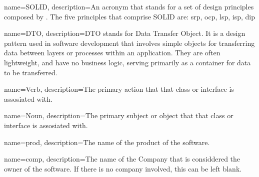 
{ name=SOLID, description={An acronym that stands for a set of design principles
    composed by . The five
    principles that comprise SOLID are: \acrlong*{srp}, \acrlong*{ocp}, \acrlong*{lsp},
    \acrlong*{isp}, \acrlong*{dip}} }

{ name=DTO, description={DTO stands for Data Transfer Object. It is a design pattern used
    in software development that involves simple objects for transferring data between
    layers or processes within an application. They are often lightweight, and have no
    business logic, serving primarily as a container for data to be transferred.} }

{
    name=Verb,
    description={The primary action that that class or interface is assosiated with.}
}

{
    name=Noun,
    description={The primary subject or object that that class or interface is assosiated with.}
}

{
    name=prod,
    description={The name of the product of the software.}
}

{
    name=comp,
    description={The name of the Company that is considdered the owner of the software. If
    there is no company involved, this can be left blank.}
}

